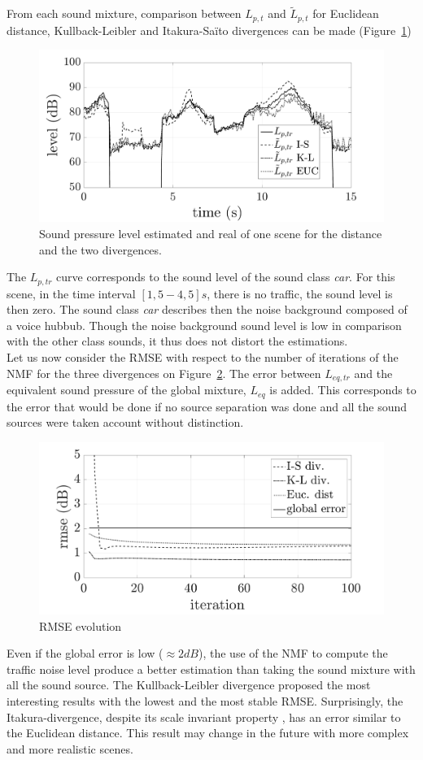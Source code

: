 \documentclass{article}
\begin{document}
\begin{sloppy}
From each sound mixture, comparison between $L_{p,t}$ and $\tilde{L}_{p,t}$ for Euclidean distance, Kullback-Leibler and Itakura-Saïto divergences can be made (Figure~\ref{fig:Lp})\\

\begin{figure}[t]
\centering
\centerline{\includegraphics[width=.5\textwidth]{images/Lp_bvak_Sc2_It100_nbCl3.pdf}}
\caption{Sound pressure level estimated and real of one scene for the distance and the two divergences.}
\label{fig:Lp}
\end{figure}

The $L_{p,tr}$ curve corresponds to the sound level of the sound class \textit{car}. For this scene, in the time interval $\left[ 1,5 - 4,5\right] s$, there is no traffic, the sound level is then zero. The sound class \textit{car} describes then the noise background composed of a voice hubbub. Though the noise background sound level is low in comparison with the other class sounds, it thus does not distort the estimations.\\

Let us now consider the RMSE with respect to the number of iterations of the NMF for the three divergences on Figure~\ref{fig:rmse}. The error between $L_{eq,tr}$ and the equivalent sound pressure of the global mixture, $L_{eq}$ is added. This corresponds to the error that would be done if no source separation was done and all the sound sources were taken account without distinction.

\begin{figure}[t]
\centering
\includegraphics[width=.5\textwidth]{images/comparaison_RMSE_nbCl3.pdf}
\caption{RMSE evolution}
\label{fig:rmse}
\end{figure}

Even if the global error is low ($\approx 2 dB$), the use of the NMF to compute the traffic noise level produce a better estimation than taking the sound mixture with all the sound source. The Kullback-Leibler divergence proposed the most interesting results with the lowest and the most stable RMSE. 
Surprisingly, the Itakura-divergence, despite its scale invariant property \cite{fevotte2011}, has an error similar to the Euclidean distance. This result may change in the future with more complex and more realistic scenes.



\end{sloppy}
\end{document}
